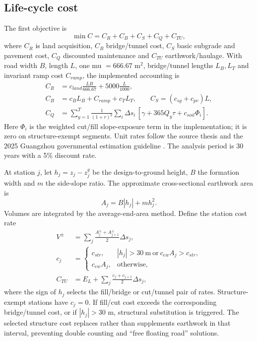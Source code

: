 \documentclass[preprint,12pt]{elsarticle}
\begin{document}
\subsection{Life-cycle cost}

The first objective is
\begin{equation}
\min C=C_R+C_B+C_S+C_Q+C_{TU},
\label{eq:lcc}
\end{equation}
where $C_R$ is land acquisition, $C_B$ bridge/tunnel cost, $C_S$ basic subgrade and pavement cost, $C_Q$ discounted maintenance and $C_{TU}$ earthwork/haulage. With road width $B$, length $L$, one mu $=666.67$ m$^2$, bridge/tunnel lengths $L_B,L_T$ and invariant ramp cost $C_{ramp}$, the implemented accounting is
\begin{align}
C_R&=c_{land}\frac{LB}{666.67}+5000\frac{L}{1000},\\
C_B&=c_B L_B+C_{ramp}+c_T L_T,\qquad
C_S=(c_{sg}+c_{pv})L,\label{eq:lccparts}\\
C_Q&=\sum_{y=1}^{T}\frac{1}{(1+r)^y}
\sum_i\Delta s_i\,[\gamma+365Q_y\tau+c_{soil}\Phi_i].
\end{align}
Here $\Phi_i$ is the weighted cut/fill slope-exposure term in the implementation; it is zero on structure-exempt segments. Unit rates follow the source thesis and the 2025 Guangzhou governmental estimation guideline \cite{guangzhou2025}. The analysis period is 30 years with a 5\% discount rate.

At station $j$, let $h_j=z_j-z^g_j$ be the design-to-ground height, $B$ the formation width and $m$ the side-slope ratio. The approximate cross-sectional earthwork area is
\begin{equation}
A_j=B|h_j|+m h_j^2.
\end{equation}
Volumes are integrated by the average-end-area method. Define the station cost rate
\begin{align}
V^{\pm}&=\sum_j\frac{A_j^{\pm}+A_{j+1}^{\pm}}{2}\Delta s_j,\\
c_j&=\begin{cases}
c_{str},& |h_j|>30\ \mathrm{m}\ \text{or}\ c_{ew}A_j>c_{str},\\
c_{ew}A_j,&\text{otherwise},
\end{cases}\\
C_{TU}&=E_L+\sum_j\frac{c_j+c_{j+1}}{2}\Delta s_j,
\label{eq:earthwork}
\end{align}
where the sign of $h_j$ selects the fill/bridge or cut/tunnel pair of rates. Structure-exempt stations have $c_j=0$. If fill/cut cost exceeds the corresponding bridge/tunnel cost, or if $|h_j|>30$ m, structural substitution is triggered. The selected structure cost replaces rather than supplements earthwork in that interval, preventing double counting and ``free floating road'' solutions.
\end{document}
